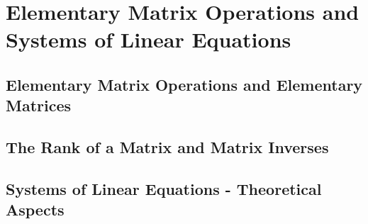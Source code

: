 \chapter{Elementary Matrix Operations and Systems of Linear Equations}
\thispagestyle{empty}
\newpage

\section{Elementary Matrix Operations and Elementary Matrices}



\vspace{12pt}

\setcounter{Exercise}{11}



\section{The Rank of a Matrix and Matrix Inverses}



\vspace{12pt}

\setcounter{Exercise}{2}


\vspace{12pt}



\vspace{12pt}



\vspace{12pt}



\vspace{12pt}



\vspace{12pt}

\setcounter{Exercise}{13}


\vspace{12pt}

\setcounter{Exercise}{16}



\section{Systems of Linear Equations - Theoretical Aspects}

